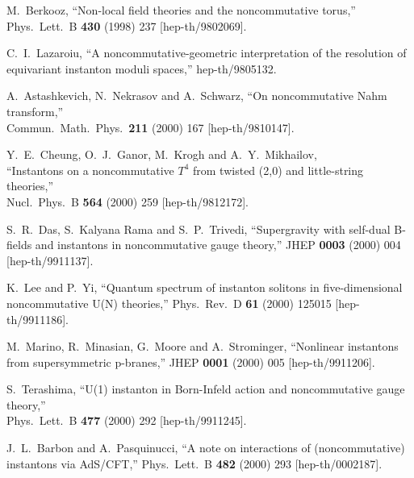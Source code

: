 \documentclass[a4paper,11pt]{article}
\numberwithin{equation}{section}
\begin{document}
{\begin{thebibliography}{99}
M.~Berkooz,
``Non-local field theories and the noncommutative torus,''\\
Phys.\ Lett.\ B {\bf 430} (1998) 237
[hep-th/9802069].

C.~I.~Lazaroiu,
``A noncommutative-geometric interpretation of the resolution of  
  equivariant instanton moduli spaces,''
hep-th/9805132.

A.~Astashkevich, N.~Nekrasov and A.~Schwarz,
``On noncommutative Nahm transform,''\\
Commun.\ Math.\ Phys.\  {\bf 211} (2000) 167
[hep-th/9810147].

Y.~E.~Cheung, O.~J.~Ganor, M.~Krogh and A.~Y.~Mikhailov,\\
``Instantons on a noncommutative $T^4$ from twisted (2,0) and  
  little-string theories,'' \\
Nucl.\ Phys.\ B {\bf 564} (2000) 259
[hep-th/9812172].

S.~R.~Das, S.~Kalyana Rama and S.~P.~Trivedi,
``Supergravity with self-dual B-fields and instantons in noncommutative  
  gauge theory,''
JHEP {\bf 0003} (2000) 004
[hep-th/9911137].

K.~Lee and P.~Yi,
``Quantum spectrum of instanton solitons in five-dimensional  
  noncommutative U(N) theories,''
Phys.\ Rev.\ D {\bf 61} (2000) 125015
[hep-th/9911186].

M.~Marino, R.~Minasian, G.~Moore and A.~Strominger,
``Nonlinear instantons from supersymmetric p-branes,''
JHEP {\bf 0001} (2000) 005
[hep-th/9911206].

S.~Terashima,
``U(1) instanton in Born-Infeld action and noncommutative gauge theory,''\\
Phys.\ Lett.\ B {\bf 477} (2000) 292
[hep-th/9911245].

J.~L.~Barbon and A.~Pasquinucci,
``A note on interactions of (noncommutative) instantons via AdS/CFT,''
Phys.\ Lett.\ B {\bf 482} (2000) 293
[hep-th/0002187].


\end{thebibliography}}
\end{document}
